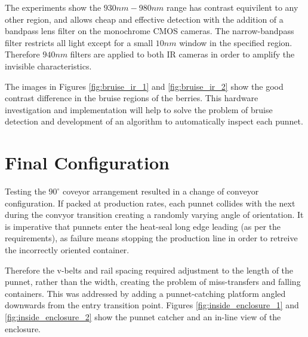\documentclass[fleqn,twoside,12pt]{report}
\begin{document}
The experiments show the $930nm-980nm$ range has contrast equivilent to any other region, and allows cheap and effective detection with the addition of a bandpass lens filter on the monochrome CMOS cameras. The narrow-bandpass filter restricts all light except for a small $10nm$ window in the specified region. Therefore $940nm$ filters are applied to both IR cameras in order to amplify the invisible characteristics. 


The images in Figures \ref{fig:bruise_ir_1} and \ref{fig:bruise_ir_2} show the good contrast difference in the bruise regions of the berries. This hardware investigation and implementation will help to solve the problem of bruise detection and development of an algorithm to automatically inspect each punnet.

 

\section{Final Configuration}


Testing the $90^{\circ}$ coveyor arrangement resulted in a change of conveyor configuration. If packed at production rates, each punnet collides with the next during the convyor transition creating a randomly varying angle of orientation. It is imperative that punnets enter the heat-seal long edge leading (as per the requirements), as failure means stopping the production line in order to retreive the incorrectly oriented container.

Therefore the v-belts and rail spacing required adjustment to the length of the punnet, rather than the width, creating the problem of miss-transfers and falling containers. This was addressed by adding a punnet-catching platform angled downwards from the entry transition point. Figures \ref{fig:inside_enclosure_1} and \ref{fig:inside_enclosure_2} show the punnet catcher and an in-line view of the enclosure.
\end{document}
